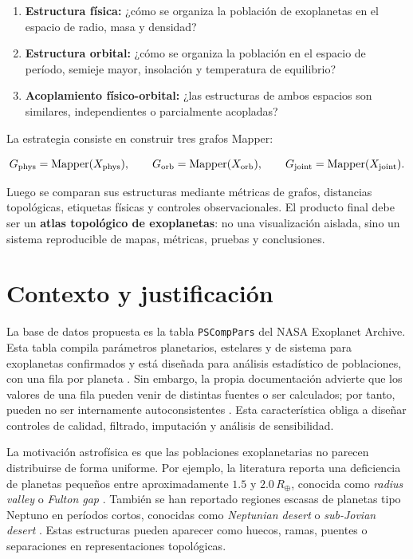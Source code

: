 \documentclass[11pt,letterpaper]{article}
\newcommand{\Mapper}{\operatorname{Mapper}}
\newcommand{\phys}{\rm phys}
\newcommand{\orb}{\rm orb}
\newcommand{\joint}{\rm joint}
\begin{document}
\begin{enumerate}
    \item \textbf{Estructura física:} ¿cómo se organiza la población de exoplanetas en el espacio de radio, masa y densidad?
    \item \textbf{Estructura orbital:} ¿cómo se organiza la población en el espacio de período, semieje mayor, insolación y temperatura de equilibrio?
    \item \textbf{Acoplamiento físico-orbital:} ¿las estructuras de ambos espacios son similares, independientes o parcialmente acopladas?
\end{enumerate}

La estrategia consiste en construir tres grafos Mapper:

\begin{equation}
G_{\phys}=\Mapper(X_{\phys}),\qquad
G_{\orb}=\Mapper(X_{\orb}),\qquad
G_{\joint}=\Mapper(X_{\joint}).
\end{equation}

Luego se comparan sus estructuras mediante métricas de grafos, distancias topológicas, etiquetas físicas y controles observacionales. El producto final debe ser un \textbf{atlas topológico de exoplanetas}: no una visualización aislada, sino un sistema reproducible de mapas, métricas, pruebas y conclusiones.

\section{Contexto y justificación}

La base de datos propuesta es la tabla \texttt{PSCompPars} del NASA Exoplanet Archive. Esta tabla compila parámetros planetarios, estelares y de sistema para exoplanetas confirmados y está diseñada para análisis estadístico de poblaciones, con una fila por planeta \cite{nasa_pscp_about,nasa_ps_columns}. Sin embargo, la propia documentación advierte que los valores de una fila pueden venir de distintas fuentes o ser calculados; por tanto, pueden no ser internamente autoconsistentes \cite{nasa_pscp_calc}. Esta característica obliga a diseñar controles de calidad, filtrado, imputación y análisis de sensibilidad.

La motivación astrofísica es que las poblaciones exoplanetarias no parecen distribuirse de forma uniforme. Por ejemplo, la literatura reporta una deficiencia de planetas pequeños entre aproximadamente $1.5$ y $2.0\,R_\oplus$, conocida como \emph{radius valley} o \emph{Fulton gap} \cite{fulton2017gap}. También se han reportado regiones escasas de planetas tipo Neptuno en períodos cortos, conocidas como \emph{Neptunian desert} o \emph{sub-Jovian desert} \cite{mazeh2016desert}. Estas estructuras pueden aparecer como huecos, ramas, puentes o separaciones en representaciones topológicas.
\end{document}
